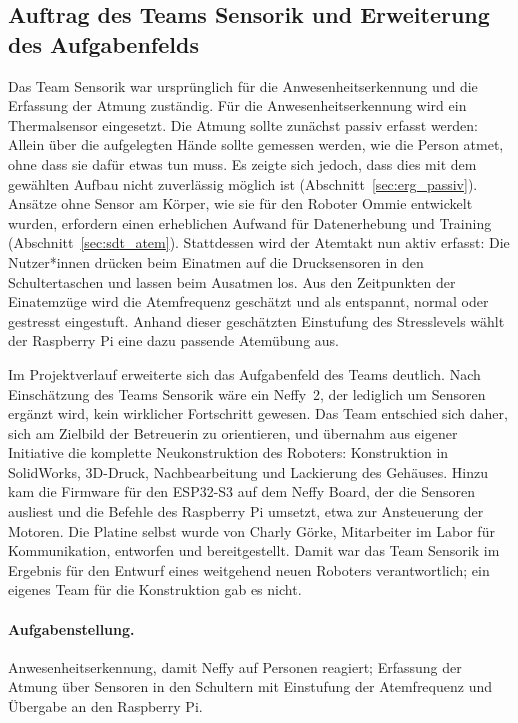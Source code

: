 \subsection*{Auftrag des Teams Sensorik und Erweiterung des Aufgabenfelds}

Das Team Sensorik war ursprünglich für die Anwesenheitserkennung und die Erfassung
der Atmung zuständig. Für die Anwesenheitserkennung wird ein Thermalsensor
eingesetzt.
Die Atmung sollte zunächst passiv erfasst werden: Allein über die aufgelegten Hände
sollte gemessen werden, wie die Person atmet, ohne dass sie dafür etwas tun muss.
Es zeigte sich jedoch, dass dies mit dem gewählten Aufbau nicht zuverlässig möglich ist
(Abschnitt~\ref{sec:erg_passiv}). Ansätze ohne Sensor am Körper, wie sie für den Roboter
Ommie entwickelt wurden, erfordern einen erheblichen Aufwand für Datenerhebung und Training
(Abschnitt~\ref{sec:sdt_atem}). Stattdessen wird der Atemtakt nun aktiv erfasst: Die
Nutzer*innen drücken beim Einatmen auf die Drucksensoren in den Schultertaschen und lassen
beim Ausatmen los. Aus den Zeitpunkten der Einatemzüge wird die Atemfrequenz geschätzt und
als entspannt, normal oder gestresst eingestuft. Anhand dieser geschätzten Einstufung des Stresslevels wählt der
Raspberry Pi eine dazu passende Atemübung aus.

Im Projektverlauf erweiterte sich das Aufgabenfeld des Teams deutlich. Nach
Einschätzung des Teams Sensorik wäre ein Neffy~2, der lediglich um Sensoren ergänzt
wird, kein wirklicher Fortschritt gewesen. Das Team entschied sich daher, sich am Zielbild
der Betreuerin zu orientieren, und übernahm aus eigener Initiative die
komplette Neukonstruktion des Roboters: Konstruktion in SolidWorks, 3D-Druck,
Nachbearbeitung und Lackierung des Gehäuses. Hinzu kam die Firmware für den
ESP32-S3 auf dem Neffy Board, der die Sensoren ausliest und die Befehle des
Raspberry Pi umsetzt, etwa zur Ansteuerung der Motoren. Die Platine selbst wurde von
Charly Görke, Mitarbeiter im Labor für Kommunikation, entworfen und bereitgestellt. Damit war
das Team Sensorik im Ergebnis für den Entwurf eines weitgehend neuen Roboters verantwortlich;
ein eigenes Team für die Konstruktion gab es nicht.

\paragraph{Aufgabenstellung.} Anwesenheitserkennung, damit Neffy auf Personen reagiert; Erfassung
der Atmung über Sensoren in den Schultern mit Einstufung der Atemfrequenz und Übergabe an den
Raspberry Pi.

